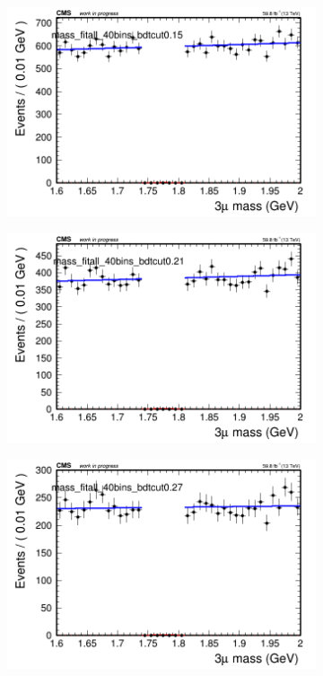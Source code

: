 \begin{figure}[H]
    \centering
    \begin{subfigure}{0.2\textwidth}
        \includegraphics[width=\textwidth]{unfixed_exp/plots/all/massfit_all_40bins_bdtcut0.15.png}
        \caption{}
    \end{subfigure}
    \begin{subfigure}{0.2\textwidth}
        \includegraphics[width=\textwidth]{unfixed_exp/plots/all/massfit_all_40bins_bdtcut0.21.png}
        \caption{}
    \end{subfigure}
    \begin{subfigure}{0.2\textwidth}
        \includegraphics[width=\textwidth]{unfixed_exp/plots/all/massfit_all_40bins_bdtcut0.27.png}

\end{subfigure}
\end{figure}
